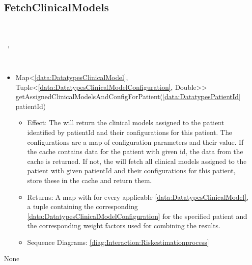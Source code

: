   \subsection{FetchClinicalModels}\label{int:InterfacesFetchClinicalModels}
    \begin{description}
      \item[Provided by:] \iconcomponent{}~
      \item[Required by:] \iconcomponent{}~, \iconcomponent{}~ 
      \item[Operations:] ~
    \begin{itemize}[noitemsep,nolistsep,leftmargin=-.25cm]
      \item \textsf{Map\textless{}\ref{data:DatatypesClinicalModel}, Tuple\textless{}\ref{data:DatatypesClinicalModelConfiguration}, Double\textgreater{}\textgreater{} getAssignedClinicalModelsAndConfigForPatient(\ref{data:DatatypesPatientId} patientId)}
        \begin{itemize}[noitemsep,nolistsep]
           \item Effect: The  will return the clinical models assigned to the patient identified by patientId and their configurations for this patient. The configurations are
a map of configuration parameters and their value. If the cache contains data for the patient with given id, the data from the cache is returned. If not, the  will
fetch all clinical models assigned to the patient with given patientId and their configurations for this patient, store these in the cache and return them. 
           \item Returns: A map with for every applicable \ref{data:DatatypesClinicalModel}, a tuple containing the corresponding \ref{data:DatatypesClinicalModelConfiguration} for the specified patient and the corresponding weight factors used for combining the results.
           \item Sequence Diagrams: \cref{diag:Interaction:Riskestimationprocess}
        \end{itemize}
    \end{itemize}
      \item[Diagrams:] None
    \end{description}

